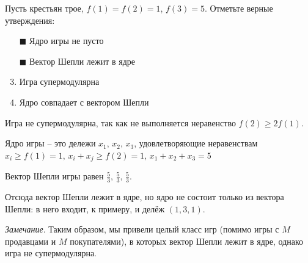 	Пусть крестьян трое, $f(1)=f(2)=1$, $f(3)=5$. Отметьте верные утверждения:
	
	\begin{enumerate}[label=$\square$]
		\item[$\blacksquare$] Ядро игры не пусто
		\item[$\blacksquare$] Вектор Шепли лежит в ядре
		\item Игра супермодулярна
		\item Ядро совпадает с вектором Шепли
	\end{enumerate}

	\solution
	Игра не супермодулярна, так как не выполняется неравенство $f(2) \geq 2f(1)$.
	
	Ядро игры -- это дележи $x_1,\,x_2,\,x_3$, удовлетворяющие неравенствам $x_i \geq f(1)=1,\, x_i+x_j \geq f(2)=1,\, x_1+x_2+x_3=5$
	
	Вектор Шепли игры равен $\frac{5}{3},\,\frac{5}{3},\,\frac{5}{3}$.
	
	Отсюда вектор Шепли лежит в ядре, но ядро не состоит только из вектора Шепли: в него входит, к примеру, и делёж $(1,3,1)$.
	
	\textit{Замечание}. Таким образом, мы привели целый класс игр (помимо игры с $M$ продавцами и $M$ покупателями), в которых вектор Шепли лежит в ядре, однако игра не супермодулярна.